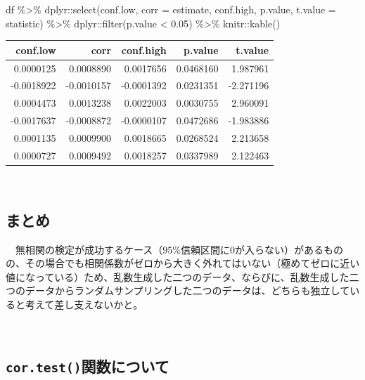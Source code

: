 \documentclass[]{tufte-handout}
\newenvironment{Shaded}{}{}
\newcommand{\AttributeTok}[1]{\textcolor[rgb]{0.49,0.56,0.16}{#1}}
\newcommand{\FloatTok}[1]{\textcolor[rgb]{0.25,0.63,0.44}{#1}}
\newcommand{\FunctionTok}[1]{\textcolor[rgb]{0.02,0.16,0.49}{#1}}
\newcommand{\NormalTok}[1]{#1}
\newcommand{\SpecialCharTok}[1]{\textcolor[rgb]{0.25,0.44,0.63}{#1}}
\begin{document}
\begin{Shaded}
\begin{Highlighting}[numbers=left,,]
\NormalTok{df }\SpecialCharTok{\%\textgreater{}\%} 
\NormalTok{  dplyr}\SpecialCharTok{::}\FunctionTok{select}\NormalTok{(conf.low, }\AttributeTok{corr =}\NormalTok{ estimate, conf.high,}
\NormalTok{                p.value, }\AttributeTok{t.value =}\NormalTok{ statistic) }\SpecialCharTok{\%\textgreater{}\%} 
\NormalTok{  dplyr}\SpecialCharTok{::}\FunctionTok{filter}\NormalTok{(p.value }\SpecialCharTok{\textless{}} \FloatTok{0.05}\NormalTok{) }\SpecialCharTok{\%\textgreater{}\%} 
\NormalTok{  knitr}\SpecialCharTok{::}\FunctionTok{kable}\NormalTok{()}
\end{Highlighting}
\end{Shaded}

\begin{longtable}[]{@{}rrrrr@{}}
\toprule
conf.low & corr & conf.high & p.value & t.value \\
\midrule
\endhead
0.0000125 & 0.0008890 & 0.0017656 & 0.0468160 & 1.987961 \\
-0.0018922 & -0.0010157 & -0.0001392 & 0.0231351 & -2.271196 \\
0.0004473 & 0.0013238 & 0.0022003 & 0.0030755 & 2.960091 \\
-0.0017637 & -0.0008872 & -0.0000107 & 0.0472686 & -1.983886 \\
0.0001135 & 0.0009900 & 0.0018665 & 0.0268524 & 2.213658 \\
0.0000727 & 0.0009492 & 0.0018257 & 0.0337989 & 2.122463 \\
\bottomrule
\end{longtable}

　

\hypertarget{ux307eux3068ux3081}{%
\subsection{まとめ}\label{ux307eux3068ux3081}}

　無相関の検定が成功するケース（\(95\%\)信頼区間に\(0\)が入らない）があるものの、その場合でも相関係数がゼロから大きく外れてはいない（極めてゼロに近い値になっている）ため、乱数生成した二つのデータ、ならびに、乱数生成した二つのデータからランダムサンプリングした二つのデータは、どちらも独立していると考えて差し支えないかと。

　

\hypertarget{cor.testux95a2ux6570ux306bux3064ux3044ux3066}{%
\subsection{\texorpdfstring{\texttt{cor.test()}関数について}{cor.test()関数について}}\label{cor.testux95a2ux6570ux306bux3064ux3044ux3066}}
\end{document}
